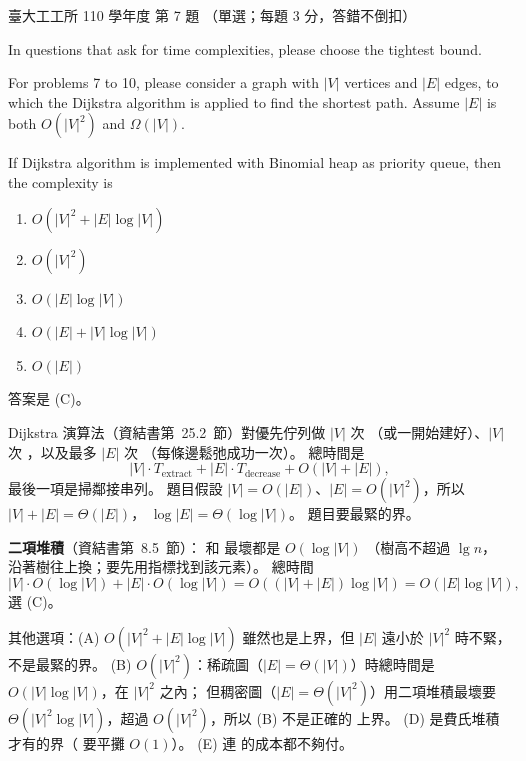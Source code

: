 \begin{pastexam}[label={px:ntu-110-ie-ds-07}]{臺大工工所 110 學年度 第 7 題}
（單選；每題 3 分，答錯不倒扣）

In questions that ask for time complexities, please choose the tightest bound.

For problems 7 to 10, please consider a graph with $|V|$ vertices and $|E|$ edges, to which the Dijkstra
algorithm is applied to find the shortest path. Assume $|E|$ is both $O(|V|^2)$ and $\Omega(|V|)$.

If Dijkstra algorithm is implemented with Binomial heap as priority queue, then the complexity is

\begin{enumerate}[label=(\Alph*)]
\item $O(|V|^2+|E|\log|V|)$
\item $O(|V|^2)$
\item $O(|E|\log|V|)$
\item $O(|E|+|V|\log|V|)$
\item $O(|E|)$
\end{enumerate}
\end{pastexam}

\begin{pastsoln}
答案是 (C)。

Dijkstra 演算法（資結書第~25.2~節）對優先佇列做 $|V|$ 次 （或一開始建好）、$|V|$ 次
，以及最多 $|E|$ 次 （每條邊鬆弛成功一次）。 總時間是
\[
  |V| \cdot T_{\text{extract}} + |E| \cdot T_{\text{decrease}} + O(|V| + |E|) ,
\]
最後一項是掃鄰接串列。 題目假設 $|V| = O(|E|)$、$|E| = O(|V|^2)$，所以 $|V| + |E| = \Theta(|E|)$，
$\log|E| = \Theta(\log|V|)$。 題目要最緊的界。

\textbf{二項堆積}（資結書第~8.5~節）： 和  最壞都是 $O(\log|V|)$
（樹高不超過 $\lg n$， 沿著樹往上換；要先用指標找到該元素）。 總時間
\[
  |V| \cdot O(\log|V|) + |E| \cdot O(\log|V|) = O((|V| + |E|)\log|V|) = O(|E|\log|V|) ,
\]
選 (C)。

其他選項：(A) $O(|V|^2 + |E|\log|V|)$ 雖然也是上界，但 $|E|$ 遠小於 $|V|^2$ 時不緊，不是最緊的界。
(B) $O(|V|^2)$：稀疏圖（$|E| = \Theta(|V|)$）時總時間是 $O(|V|\log|V|)$，在 $|V|^2$ 之內；
但稠密圖（$|E| = \Theta(|V|^2)$）用二項堆積最壞要 $\Theta(|V|^2 \log|V|)$，超過 $O(|V|^2)$，所以 (B) 不是正確的
上界。 (D) 是費氏堆積才有的界（ 要平攤 $O(1)$）。 (E) 連  的成本都不夠付。
\end{pastsoln}
